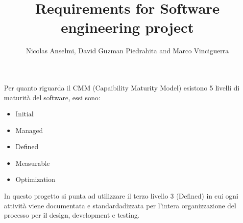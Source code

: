 \documentclass{article}
\title{Requirements for Software engineering project}
\author{Nicolas Anselmi, David Guzman Piedrahita and Marco Vinciguerra}
\begin{document}
\maketitle
Per quanto riguarda il CMM (Capaibility Maturity Model) esistono 5 livelli di maturità del software, essi sono:
\begin{itemize}
    \item Initial
    \item Managed
    \item Defined
    \item Measurable
    \item Optimization
\end{itemize}
In questo progetto si punta ad utilizzare il terzo livello 3 (Defined) in cui ogni attività viene documentata
e standardadizzata per l'intera organizzazione del processo per il design, development e testing.
\end{document}
